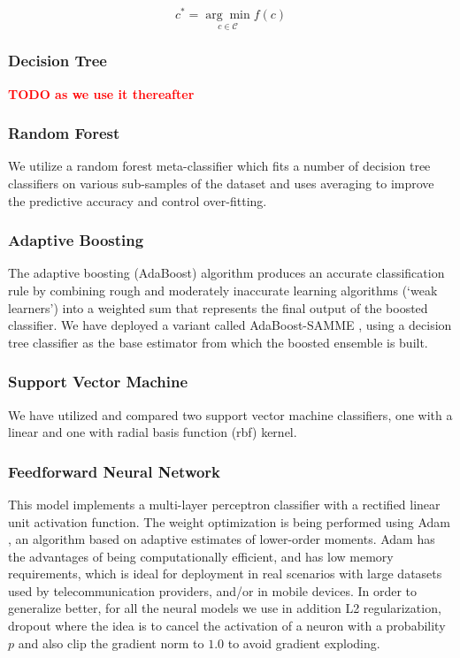 \documentclass[letterpaper]{article}
\newcommand{\note}[1]{\textbf{\textcolor{red}{#1}}}
\begin{document}
\begin{equation} \label{regression eq}
	c^* = \underset{c \in \mathcal{C}}{\arg \min} f(c) 
\end{equation}

\subsubsection{Decision Tree} \label{Decision Tree}
\note{TODO as we use it thereafter}

\subsubsection{Random Forest}  \label{Random Forest}

We utilize a random forest meta-classifier which fits a number of decision tree classifiers on various sub-samples of the dataset and uses averaging to improve the predictive accuracy and control over-fitting. 

\subsubsection{Adaptive Boosting}  \label{Adaptive Boosting}

The adaptive boosting (AdaBoost) algorithm \cite{freund1997decision} produces an accurate classification rule by combining rough and moderately inaccurate learning algorithms (`weak learners') into a weighted sum that represents the final output of the boosted classifier. We have deployed a variant called AdaBoost-SAMME \cite{hastie2009multi}, using a decision tree classifier as the base estimator from which the boosted ensemble is built.

\subsubsection{Support Vector Machine}  \label{Support Vector Machine}

We have utilized and compared two support vector machine classifiers, one with a linear and one with radial basis function (rbf) kernel. 

\subsubsection{Feedforward Neural Network}  \label{Feedforward Neural Network}

This model implements a multi-layer perceptron classifier with a rectified linear unit activation function. The weight optimization is being performed using Adam \cite{DBLP:journals/corr/KingmaB14}, an algorithm based on adaptive estimates of lower-order moments. Adam has the advantages of being computationally efficient, and has low memory requirements, which is ideal for deployment in real scenarios with large datasets used by telecommunication providers, and/or in mobile devices. In order to generalize better, for all the neural models we use in addition L2 regularization, dropout \cite{Srivastava2014} where the idea is to cancel the activation of a neuron with a probability $p$ and also clip the gradient norm to $1.0$ to avoid gradient exploding.
\end{document}
